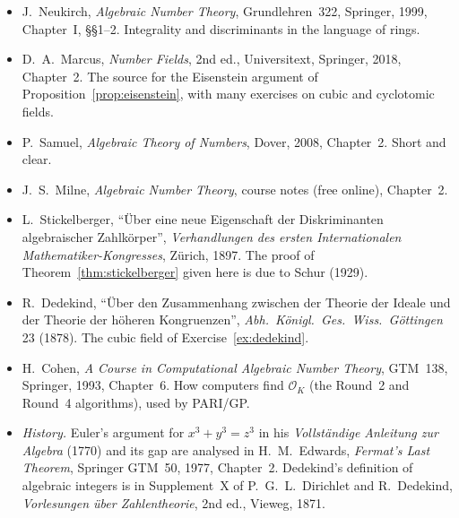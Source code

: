 \begin{itemize}
\item J.~Neukirch, \emph{Algebraic Number Theory}, Grundlehren~322, Springer, 1999, Chapter~I, \S\S1--2. Integrality and
discriminants in the language of rings.
\item D.~A.~Marcus, \emph{Number Fields}, 2nd ed., Universitext, Springer, 2018, Chapter~2. The source for the Eisenstein
argument of Proposition~\ref{prop:eisenstein}, with many exercises on cubic and cyclotomic fields.
\item P.~Samuel, \emph{Algebraic Theory of Numbers}, Dover, 2008, Chapter~2. Short and clear.
\item J.~S.~Milne, \emph{Algebraic Number Theory}, course notes (free online), Chapter~2.
\item L.~Stickelberger, ``\"Uber eine neue Eigenschaft der Diskriminanten algebraischer Zahlk\"orper'', \emph{Verhandlungen
des ersten Internationalen Mathematiker-Kongresses}, Z\"urich, 1897. The proof of Theorem~\ref{thm:stickelberger} given
here is due to Schur (1929).
\item R.~Dedekind, ``\"Uber den Zusammenhang zwischen der Theorie der Ideale und der Theorie der h\"oheren Kongruenzen'',
\emph{Abh.\ K\"onigl.\ Ges.\ Wiss.\ G\"ottingen} 23 (1878). The cubic field of Exercise~\ref{ex:dedekind}.
\item H.~Cohen, \emph{A Course in Computational Algebraic Number Theory}, GTM~138, Springer, 1993, Chapter~6. How
computers find $\mathcal O_K$ (the Round~2 and Round~4 algorithms), used by PARI/GP.
\item \emph{History.} Euler's argument for $x^3+y^3=z^3$ in his \emph{Vollst\"andige Anleitung zur Algebra} (1770) and its gap are
analysed in H.~M.~Edwards, \emph{Fermat's Last Theorem}, Springer GTM~50, 1977, Chapter~2. Dedekind's definition of algebraic
integers is in Supplement~X of P.~G.~L.~Dirichlet and R.~Dedekind, \emph{Vorlesungen \"uber Zahlentheorie}, 2nd ed., Vieweg, 1871.
\end{itemize}
